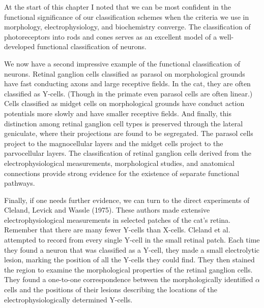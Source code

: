 At the start of this chapter I noted that we can
be most confident in the functional significance of our
classification schemes when the criteria we use in morphology,
electrophysiology, and biochemistry converge.
The classification of photoreceptors
into rods and cones serves as an excellent
model of a well-developed
functional classification of neurons.

We now have a second impressive example of
the functional classification of neurons.
Retinal ganglion
cells classified as parasol on morphological
grounds have fast conducting axons and large receptive fields.
In the cat, they are often classified as Y-cells.
(Though in the primate even parasol cells are often linear.)
Cells classified as midget cells on
morphological grounds have conduct action potentials more
slowly and have smaller receptive fields.
And finally, this distinction among retinal ganglion cell
types is preserved through the lateral geniculate, where their
projections are found to be segregated.
The parasol cells project to the magnocellular layers
and the midget cells project to the parvocellular layers.
The classification of retinal ganglion cells
derived from the electrophysiological measurements,
morphological studies, and anatomical connections provide
strong evidence for the existence of separate
functional pathways.

Finally, if one needs further evidence, we can
turn to the direct experiments of Cleland, Levick and Wassle (1975).
These authors made extensive electrophysiological measurements
in selected patches of the cat's retina.
Remember that there are many fewer Y-cells than X-cells. 
Cleland et al.
attempted to record from every single
Y-cell in the small retinal patch.
Each time they found a neuron that was classified
as a Y-cell, they made a small electrolytic lesion,
marking the position of all the Y-cells they could find.
They then stained the region to examine the morphological
properties of the retinal ganglion cells.
They found a one-to-one correspondence between the
morphologically identified $\alpha$ cells
and the positions of their lesions describing
the locations of the electrophysiologically
determined Y-cells.

